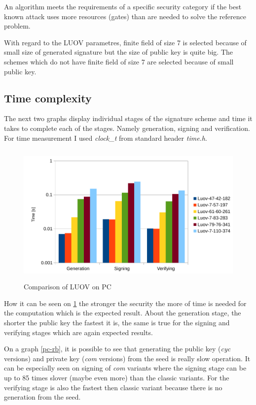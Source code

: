 \documentclass[thesis=M,english]{FITthesis}[2019/12/23]
\begin{document}
\bigskip
\noindent
An algorithm meets the requirements of a specific security category if the best known attack uses more resources (gates) than are needed to solve the reference problem.

\bigskip
\noindent
With regard to the LUOV parametres, finite field of size 7 is selected because of small size of generated signature but the size of public key is quite big. The schemes which do not have finite field of size 7 are selected because of small public key.

\subsection{Time complexity} \label{time-complex-pc}
The next two graphs display individual stages of the signature scheme and time it takes to complete each of the stages. Namely generation, signing and verification. For time measurement I used \textit{clock\_t} from standard header \textit{time.h}. 
\begin{figure}[H]
\centering
\includegraphics[width=13cm,height=7cm]{images/pc-luov.pdf}
\caption{Comparison of LUOV on PC}
\label{pc-luov}
\end{figure}

\noindent
How it can be seen on \ref{pc-luov} the stronger the security the more of time is needed for the computation which is the expected result. About the generation stage, the shorter the public key the fastest it is, the same is true for the signing and verifying stages which are again expected results.

\bigskip
\noindent
On a graph \ref{pc-rb}, it is possible to see that generating the public key (\textit{cyc} versions) and private key (\textit{com} versions) from the seed is really slow operation. It can be especially seen on signing of \textit{com} variants where the signing stage can be up to 85 times slover (maybe even more) than the classic variants. For the verifying stage is also the fastest then classic variant because there is no generation from the seed.
\end{document}
